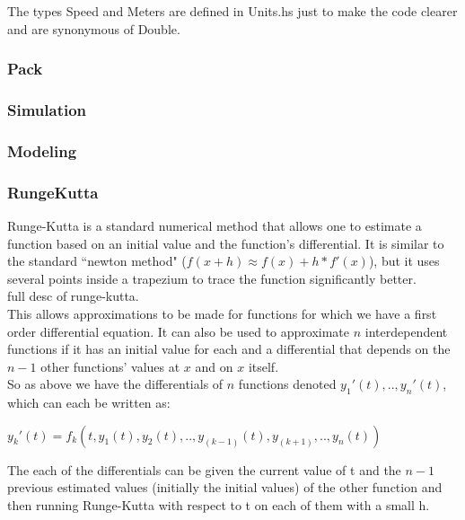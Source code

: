 \documentclass[10pt, a4paper]{report}
\begin{document}
The types Speed and Meters are defined in Units.hs just to make the code clearer and are synonymous of Double.

\subsubsection{Pack}

\subsubsection{Simulation}

\subsubsection{Modeling}

\subsubsection{RungeKutta}


Runge-Kutta is a standard numerical method that allows one to estimate a function based on an initial value and the function's differential. It is similar to the standard ``newton method" ($f(x + h) \approx f(x) + h*f'(x)$), but it uses several points inside a trapezium to trace the function significantly better. \\ %
\newline
full desc of runge-kutta.\\
\newline
This allows approximations to be made for functions for which we have a first order differential equation. It can also be used to approximate $n$ interdependent functions if it has an initial value for each and a differential that depends on the $n - 1$ other functions' values at $x$ and on $x$ itself.\\

So as above we have the differentials of $n$ functions denoted $y_1'(t),..,y_n'(t)$, which can each be written as: \\

{\centering $y_k'(t) = f_k(t,y_1(t),y_2(t),..,y_{(k-1)}(t),y_{(k+1)},..,y_n(t))$ \newline \par}

The each of the differentials can be given the current value of t and the $n - 1$ previous estimated values (initially the initial values) of the other function and then running Runge-Kutta with respect to t on each of them with a small h. \newline \par
\end{document}
